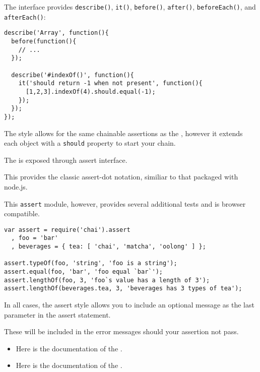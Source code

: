 The  interface provides \verb|describe()|, \verb|it()|, \verb|before()|, \verb|after()|, \verb|beforeEach()|, and \verb|afterEach()|:

\begin{verbatim}
describe('Array', function(){
  before(function(){
    // ...
  });

  describe('#indexOf()', function(){
    it('should return -1 when not present', function(){
      [1,2,3].indexOf(4).should.equal(-1);
    });
  });
});
\end{verbatim}
The  style allows for the same chainable assertions as the 
, however it extends each object with a \verb|should| 
property to start your chain. 


The  is exposed through assert interface. 

This provides the classic assert-dot notation, similiar to that packaged with node.js. 

This \verb|assert| module, however, provides several additional tests and is browser compatible.

\begin{verbatim}
var assert = require('chai').assert
  , foo = 'bar'
  , beverages = { tea: [ 'chai', 'matcha', 'oolong' ] };

assert.typeOf(foo, 'string', 'foo is a string');
assert.equal(foo, 'bar', 'foo equal `bar`');
assert.lengthOf(foo, 3, 'foo`s value has a length of 3');
assert.lengthOf(beverages.tea, 3, 'beverages has 3 types of tea');
\end{verbatim}
In all cases, the assert style allows you to include an optional message as the last parameter in the assert statement. 

These will be included in the error messages should your assertion not pass.


\begin{itemize}
\item
Here  is the documentation of the 
.


\item
Here  is the documentation of the 
.
\end{itemize}


